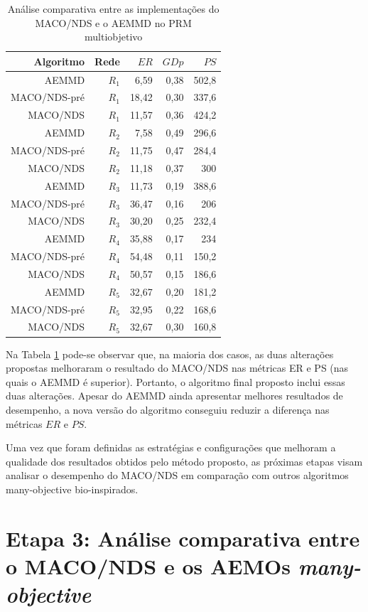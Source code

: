 \begin{table}[!htbp]
	\centering
	\caption{Análise comparativa entre as implementações do MACO/NDS e o AEMMD no PRM multiobjetivo}
	\label{tab_exp2_macod_simples}
	\begin{tabular}{rrrrr}
		Algoritmo  & Rede  & $ER$  & $GDp$ & $PS$  \\ \hline
		AEMMD      & $R_1$ & 6,59  & 0,38 & 502,8 \\
		MACO/NDS-pré & $R_1$ & 18,42 & 0,30 & 337,6 \\
		MACO/NDS     & $R_1$ & 11,57 & 0,36 & 424,2 \\ \hline
		AEMMD      & $R_2$ & 7,58  & 0,49 & 296,6 \\
		MACO/NDS-pré & $R_2$ & 11,75 & 0,47 & 284,4 \\
		MACO/NDS     & $R_2$ & 11,18 & 0,37 & 300   \\ \hline
		AEMMD      & $R_3$ & 11,73 & 0,19 & 388,6 \\
		MACO/NDS-pré & $R_3$ & 36,47 & 0,16 & 206   \\
		MACO/NDS     & $R_3$ & 30,20 & 0,25 & 232,4 \\ \hline
		AEMMD      & $R_4$ & 35,88 & 0,17 & 234   \\
		MACO/NDS-pré & $R_4$ & 54,48 & 0,11 & 150,2 \\
		MACO/NDS     & $R_4$ & 50,57 & 0,15 & 186,6 \\ \hline
		AEMMD      & $R_5$ & 32,67 & 0,20 & 181,2 \\
		MACO/NDS-pré & $R_5$ & 32,95 & 0,22 & 168,6 \\
		MACO/NDS     & $R_5$ & 32,67 & 0,30 & 160,8
	\end{tabular}
\end{table}

Na Tabela \ref{tab_exp2_macod_simples} pode-se observar que, na maioria dos casos, as duas alterações propostas melhoraram o resultado do MACO/NDS nas métricas ER e PS (nas quais o AEMMD é superior). Portanto, o algoritmo final proposto inclui essas duas alterações. Apesar do AEMMD ainda apresentar melhores resultados de desempenho, a nova versão do algoritmo conseguiu reduzir a diferença nas métricas $ER$ e $PS$.

Uma vez que foram definidas as estratégias e configurações que melhoram a qualidade dos resultados obtidos pelo método proposto, as próximas etapas visam analisar o desempenho do MACO/NDS em comparação com outros algoritmos many-objective bio-inspirados.

\section{Etapa 3: Análise comparativa entre o MACO/NDS e os AEMOs \textit{many-objective}}
\label{section_experimentos_etapa3}

